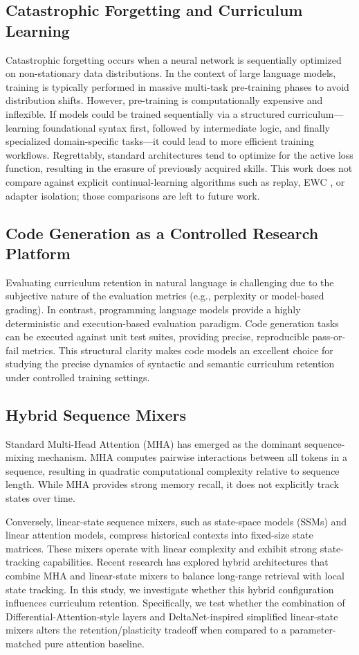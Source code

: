 \documentclass[11pt,a4paper]{article}
\begin{document}
\subsection{Catastrophic Forgetting and Curriculum Learning}
Catastrophic forgetting occurs when a neural network is sequentially optimized on non-stationary data distributions. In the context of large language models, training is typically performed in massive multi-task pre-training phases to avoid distribution shifts. However, pre-training is computationally expensive and inflexible. If models could be trained sequentially via a structured curriculum---learning foundational syntax first, followed by intermediate logic, and finally specialized domain-specific tasks---it could lead to more efficient training workflows. Regrettably, standard architectures tend to optimize for the active loss function, resulting in the erasure of previously acquired skills. This work does not compare against explicit continual-learning algorithms such as replay, EWC \cite{kirkpatrick2017overcoming}, or adapter isolation; those comparisons are left to future work.

\subsection{Code Generation as a Controlled Research Platform}
Evaluating curriculum retention in natural language is challenging due to the subjective nature of the evaluation metrics (e.g., perplexity or model-based grading). In contrast, programming language models provide a highly deterministic and execution-based evaluation paradigm. Code generation tasks can be executed against unit test suites, providing precise, reproducible pass-or-fail metrics. This structural clarity makes code models an excellent choice for studying the precise dynamics of syntactic and semantic curriculum retention under controlled training settings.

\subsection{Hybrid Sequence Mixers}
Standard Multi-Head Attention (MHA) has emerged as the dominant sequence-mixing mechanism. MHA computes pairwise interactions between all tokens in a sequence, resulting in quadratic computational complexity relative to sequence length. While MHA provides strong memory recall, it does not explicitly track states over time. 

Conversely, linear-state sequence mixers, such as state-space models (SSMs) and linear attention models, compress historical contexts into fixed-size state matrices. These mixers operate with linear complexity and exhibit strong state-tracking capabilities. Recent research has explored hybrid architectures that combine MHA and linear-state mixers to balance long-range retrieval with local state tracking. In this study, we investigate whether this hybrid configuration influences curriculum retention. Specifically, we test whether the combination of Differential-Attention-style layers and DeltaNet-inspired simplified linear-state mixers alters the retention/plasticity tradeoff when compared to a parameter-matched pure attention baseline.
\end{document}
